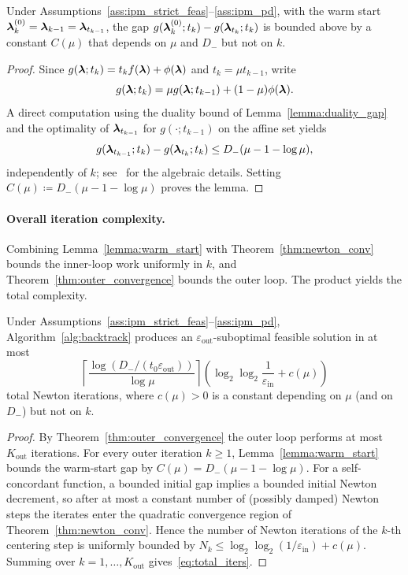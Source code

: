 \begin{lemma}\label{lemma:warm_start}
	Under Assumptions~\ref{ass:ipm_strict_feas}--\ref{ass:ipm_pd}, with the warm start $\boldsymbol{\lambda}_k^{(0)} = \boldsymbol{\lambda}_{k-1}=\boldsymbol{\lambda}_{t_{k-1}}$, the gap $g(\boldsymbol{\lambda}_k^{(0)};t_k) - g(\boldsymbol{\lambda}_{t_k};t_k)$ is bounded above by a constant $C(\mu)$ that depends on $\mu$ and $D_-$ but not on $k$.
\end{lemma}
\begin{proof}
	Since $g(\boldsymbol{\lambda};t_k) = t_k f(\boldsymbol{\lambda}) + \phi(\boldsymbol{\lambda})$ and $t_k=\mu t_{k-1}$, write
	\begin{equation*}
		g(\boldsymbol{\lambda};t_k) = \mu g(\boldsymbol{\lambda};t_{k-1}) + (1-\mu)\phi(\boldsymbol{\lambda}).
	\end{equation*}
	A direct computation using the duality bound of Lemma~\ref{lemma:duality_gap} and the optimality of $\boldsymbol{\lambda}_{t_{k-1}}$ for $g(\cdot;t_{k-1})$ on the affine set yields
	\begin{equation*}
		g(\boldsymbol{\lambda}_{t_{k-1}};t_k)-g(\boldsymbol{\lambda}_{t_k};t_k) \leq D_-(\mu - 1 - \log\mu),
	\end{equation*}
	independently of $k$; see~\cite[\S11.5.5]{ipm} for the algebraic details. Setting $C(\mu)\coloneqq D_-(\mu-1-\log\mu)$ proves the lemma.
\end{proof}

\paragraph{Overall iteration complexity.} Combining Lemma~\ref{lemma:warm_start} with Theorem~\ref{thm:newton_conv} bounds the inner-loop work uniformly in $k$, and Theorem~\ref{thm:outer_convergence} bounds the outer loop. The product yields the total complexity.

\begin{theorem}\label{thm:total_complexity}
	Under Assumptions~\ref{ass:ipm_strict_feas}--\ref{ass:ipm_pd}, Algorithm~\ref{alg:backtrack} produces an $\varepsilon_\text{out}$-suboptimal feasible solution in at most
	\begin{equation}\label{eq:total_iters}
		\left\lceil\frac{\log\!\left(D_-/(t_0\varepsilon_\text{out})\right)}{\log\mu}\right\rceil
		\left(\log_2\log_2\frac{1}{\varepsilon_\text{in}} + c(\mu)\right)
	\end{equation}
	total Newton iterations, where $c(\mu)>0$ is a constant depending on $\mu$ (and on $D_-$) but not on $k$.
\end{theorem}
\begin{proof}
	By Theorem~\ref{thm:outer_convergence} the outer loop performs at most $K_\text{out}$ iterations. For every outer iteration $k\geq 1$, Lemma~\ref{lemma:warm_start} bounds the warm-start gap by $C(\mu)=D_-(\mu-1-\log\mu)$. For a self-concordant function, a bounded initial gap implies a bounded initial Newton decrement, so after at most a constant number of (possibly damped) Newton steps the iterates enter the quadratic convergence region of Theorem~\ref{thm:newton_conv}. Hence the number of Newton iterations of the $k$-th centering step is uniformly bounded by $N_k\leq \log_2\log_2(1/\varepsilon_\text{in}) + c(\mu)$. Summing over $k=1,\ldots,K_\text{out}$ gives~\eqref{eq:total_iters}.
\end{proof}

